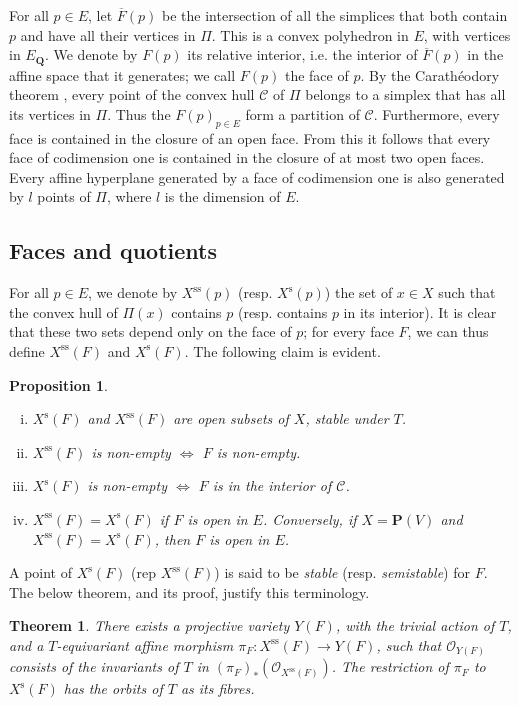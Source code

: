 \documentclass{article}
\theoremstyle{plain}
\newtheorem*{theorem}{Theorem}
\newtheorem*{proposition}{Proposition}
\theoremstyle{definition}
\newcommand{\sh}[1]{{\mathscr{#1}}}
\newcommand{\PP}{\mathbf{P}}
\newcommand{\QQ}{\mathbf{Q}}
\newcommand{\s}{\mathrm{s}}
\renewcommand{\ss}{\mathrm{ss}}
\newcommand{\oldpage}[1]{\marginpar{\footnotesize$\Big\vert$ \textit{p.~#1}}}
\begin{document}
For all $p\in E$, let $\overline{F}(p)$ be the intersection of all the simplices that both contain $p$ and have all their vertices in $\Pi$.
This is a convex polyhedron in $E$, with vertices in $E_\QQ$.
We denote by $F(p)$ its relative interior, i.e. the interior of $\overline{F}(p)$ in the affine space that it generates;
we call $F(p)$ the face of $p$.
By the Carath\'{e}odory theorem \cite[Theorem~1.21]{Val}, every point of the convex hull $\mathcal{C}$ of $\Pi$ belongs to a simplex that has all its vertices in $\Pi$.
Thus the $F(p)_{p\in E}$ form a partition of $\mathcal{C}$.
Furthermore, every face is contained in the closure of an open face.
From this it follows that every face of codimension one is contained in the closure of at most two open faces.
Every affine hyperplane generated by a face of codimension one is also generated by $l$ points of $\Pi$, where $l$ is the dimension of $E$.


\subsection{Faces and quotients}
\label{1.2}

For all $p\in E$, we denote by $X^\ss(p)$ (resp. $X^\s(p)$) the set of $x\in X$ such that the convex hull of $\Pi(x)$ contains $p$ (resp. contains $p$ in its interior).
It is clear that these two sets depend only on the face of $p$;
for every face $F$, we can thus define $X^\ss(F)$ and $X^\s(F)$.
The following claim is evident.

\begin{proposition}
  \begin{enumerate}[(i)]
    \item $X^\s(F)$ and $X^\ss(F)$ are open subsets of $X$, stable under $T$.
    \item $X^\ss(F)$ is non-empty $\iff$ $F$ is non-empty.
    \item $X^\s(F)$ is non-empty $\iff$ $F$ is in the interior of $\mathcal{C}$.
    \item $X^\ss(F)=X^\s(F)$ if $F$ is open in $E$.
      Conversely, if $X=\PP(V)$ and $X^\ss(F)=X^\s(F)$, then $F$ is open in $E$.
  \end{enumerate}
\end{proposition}

A point of $X^\s(F)$ (rep $X^\ss(F)$) is said to be \emph{stable} (resp. \emph{semistable}) for $F$.
The below theorem, and its proof, justify this terminology.

\begin{theorem}
\label{1.2-theorem}
  There exists a projective variety $Y(F)$, with the trivial action
\oldpage{513}
  of $T$, and a $T$-equivariant affine morphism $\pi_F\colon X^\ss(F)\to Y(F)$, such that $\sh{O}_{Y(F)}$ consists of the invariants of $T$ in $(\pi_F)_*(\sh{O}_{X^\ss(F)})$.
  The restriction of $\pi_F$ to $X^\s(F)$ has the orbits of $T$ as its fibres.
\end{theorem}
\end{document}
